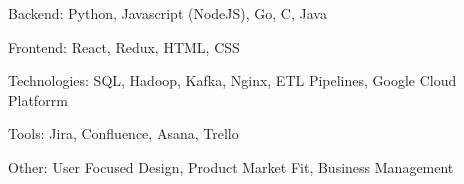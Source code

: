 

\begin{cventries}

    \begin{cvitems} %
        \item {Backend: 
        Python,
        Javascript (NodeJS),
        Go,
        C,
        Java}
        \item{
        Frontend:
        React,
        Redux,
        HTML,
        CSS}
        \item{
        Technologies: 
        SQL,
	    Hadoop,
        Kafka,
        Nginx,
	    ETL Pipelines,
	    Google Cloud Platforrm
        }
        \item{
        Tools:
        Jira,
        Confluence,
        Asana,
        Trello
        }
        \item{
        Other:
        User Focused Design,
        Product Market Fit,
        Business Management
        }
      \end{cvitems}
\end{cventries}
